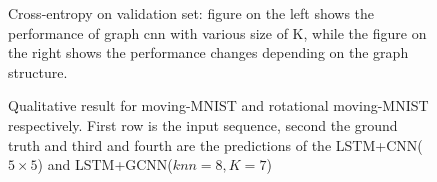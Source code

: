 \documentclass{article} %
\begin{document}

\begin{figure}[t]
	\centering
	\hfill
	\caption{Cross-entropy on validation set: figure on the left shows the performance of graph cnn with various size of K, while the figure on the right shows the performance changes depending on the graph structure.}
	\label{mMNIST_graph}
\end{figure}

\begin{figure}[t]
	\centering
	\hfill
	\caption{Qualitative result for moving-MNIST and rotational moving-MNIST respectively. First row is the input sequence, second the ground truth and third and fourth are the predictions of the LSTM+CNN($5\times5$) and LSTM+GCNN($knn=8, K=7$)}
	\label{mMNIST_img}
\end{figure}
\end{document}
